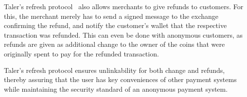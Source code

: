 \documentclass{llncs}
\begin{document}
Taler's refresh protocol~\cite{talercrypto} also allows merchants to
give refunds to customers. For this, the merchant merely has to send a
signed message to the exchange confirming the refund, and notify the
customer's wallet that the respective transaction was refunded.  This
can even be done with anonymous customers, as refunds are given as
additional change to the owner of the coins that were originally spent
to pay for the refunded transaction.

Taler's refresh protocol ensures unlinkability for both change and
refunds, thereby assuring that the user has key conveniences of other
payment systems while maintaining the security standard of an
anonymous payment system.

%
%
%
%
%
\end{document}
